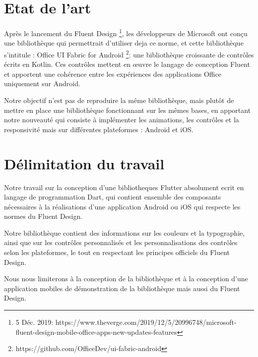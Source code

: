 \documentclass[a4paper,12pt]{report}
\begin{document}
            \section*{Etat de l’art}

                Après le lancement du Fluent Design \footnote{5 Déc. 2019: https://www.theverge.com/2019/12/5/20996748/microsoft-fluent-design-mobile-office-apps-new-updates-features}, les développeurs de Microsoft ont conçu 
                une bibliothèque qui permettrait d’utiliser deja ce norme, 
                et cette bibliothèque s’intitule : Office UI Fabric for Android \footnote{https://github.com/OfficeDev/ui-fabric-android}: 
                une bibliothèque croissante de contrôles écrits en Kotlin. 
                Ces contrôles mettent en œuvre le langage de conception Fluent et apportent une 
                cohérence entre les expériences des applications Office uniquement sur Android.
                
                
                Notre objectif n’est pas de reproduire la même bibliothèque, 
                mais plutôt de mettre en place une bibliothèque fonctionnant sur les mêmes bases, 
                en apportant notre nouveauté qui consiste à implémenter les animations, les contrôles 
                et la responsivité mais sur différentes plateformes : Android et iOS.
            
            \section*{Délimitation du travail}
                Notre travail sur la conception d’une bibliotheques Flutter absolument 
                ecrit en langage de programmation Dart, qui contient ensemble des 
                composants nécessaires à la réalisations d’une application Android ou iOS 
                qui respecte les normes du Fluent Design.

                Notre bibliothèque contient des informations sur les couleurs et la 
                typographie, ainsi que sur les contrôles personnalisés et les personnalisations 
                des contrôles selon les plateformes, le tout  en respectant les principes 
                officiels du  Fluent Design.
            
                Nous nous limiterons à la conception de la bibliothèque et à la conception 
                d’une application mobiles de démonstration de la bibliothèque mais aussi 
                du Fluent Design.
            
\end{document}
